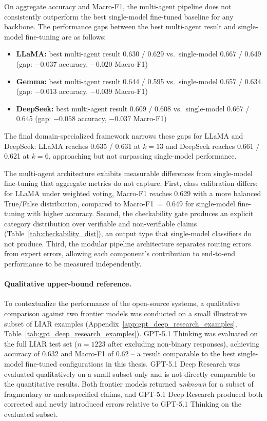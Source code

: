 On aggregate accuracy and Macro-F1, the multi-agent pipeline does not consistently outperform the best single-model fine-tuned baseline for any backbone. The performance gaps between the best multi-agent result and single-model fine-tuning are as follows:

\begin{itemize}
    \item \textbf{LLaMA:} best multi-agent result 0.630 / 0.629 
    vs.\ single-model 0.667 / 0.649 
    (gap: $-0.037$ accuracy, $-0.020$ Macro-F1)
    \item \textbf{Gemma:} best multi-agent result 0.644 / 0.595 
    vs.\ single-model 0.657 / 0.634 
    (gap: $-0.013$ accuracy, $-0.039$ Macro-F1)
    \item \textbf{DeepSeek:} best multi-agent result 0.609 / 0.608 
    vs.\ single-model 0.667 / 0.645 
    (gap: $-0.058$ accuracy, $-0.037$ Macro-F1)
\end{itemize}

The final domain-specialized framework narrows these gaps for LLaMA and DeepSeek: LLaMA reaches 0.635 / 0.631 at $k{=}13$ and DeepSeek reaches 0.661 / 0.621 at $k{=}6$, approaching but not surpassing single-model performance.

The multi-agent architecture exhibits measurable differences from single-model fine-tuning that aggregate metrics do not capture. 
First, class calibration differs: for LLaMA under weighted voting, Macro-F1 reaches 0.629 with a more balanced True/False distribution, compared to Macro-F1~=~0.649 for single-model fine-tuning with higher accuracy. Second, the checkability gate produces an explicit category distribution over verifiable and non-verifiable claims (Table~\ref{tab:checkability_dist}), an output type that single-model classifiers do not produce. Third, the modular pipeline architecture separates routing errors from expert errors, allowing each component's contribution to end-to-end performance to be measured independently.

\paragraph{Qualitative upper-bound reference.}
To contextualize the performance of the open-source systems, a qualitative comparison against two frontier models was conducted 
on a small illustrative subset of LIAR examples (Appendix~\ref{app:gpt_deep_research_examples}, Table~\ref{tab:gpt_deep_research_examples}). GPT-5.1 Thinking was evaluated on the full LIAR test set ($n = 1223$ after excluding 
non-binary responses), achieving accuracy of 0.632 and Macro-F1 of 0.62 -- a result comparable to the best single-model fine-tuned 
configurations in this thesis. GPT-5.1 Deep Research was evaluated qualitatively on a small subset only and is not directly comparable to the quantitative results. Both frontier models returned \emph{unknown} for a subset of fragmentary or underspecified claims, and GPT-5.1 Deep Research produced both corrected and newly introduced errors relative to GPT-5.1 Thinking on the evaluated 
subset.

